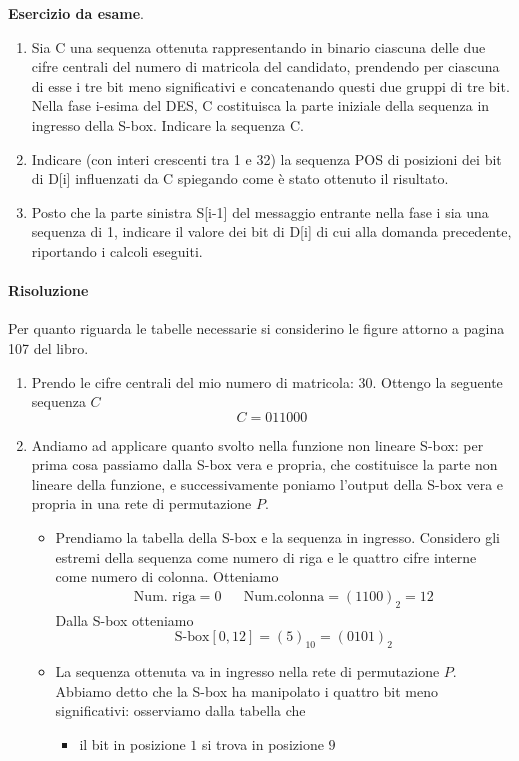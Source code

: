 \begin{framed}
	\noindent \textbf{Esercizio da esame}.
	
	\begin{enumerate}
		\item Sia C una sequenza ottenuta rappresentando in binario ciascuna delle due cifre centrali del
		numero di matricola del candidato, prendendo per ciascuna di esse i tre bit meno significativi e
		concatenando questi due gruppi di tre bit. Nella fase i-esima del DES, C costituisca la parte
		iniziale della sequenza in ingresso della S-box. Indicare la sequenza C.
		\item Indicare (con interi crescenti tra 1 e 32) la sequenza POS di posizioni dei bit di D[i] influenzati
		da C spiegando come è stato ottenuto il risultato.
		\item Posto che la parte sinistra S[i-1] del messaggio entrante nella fase i sia una sequenza di 1,
		indicare il valore dei bit di D[i] di cui alla domanda precedente, riportando i calcoli eseguiti.
	\end{enumerate}
	
	\paragraph{Risoluzione} Per quanto riguarda le tabelle necessarie si considerino le figure attorno a pagina 107 del libro.
	\begin{enumerate}
		\item Prendo le cifre centrali del mio numero di matricola: $30$. Ottengo la seguente sequenza $C$
		$$C=011000$$
		\item Andiamo ad applicare quanto svolto nella funzione non lineare S-box: per prima cosa passiamo dalla S-box vera e propria, che costituisce la parte non lineare della funzione, e successivamente poniamo l'output della S-box vera e propria in una rete di permutazione $P$. 
		\begin{itemize}
			\item Prendiamo la tabella della S-box e la sequenza in ingresso. Considero gli estremi della sequenza come numero di riga e le quattro cifre interne come numero di colonna. Otteniamo
			\begin{align*}
				\text{Num. riga} = 0 && \text{Num.colonna}=(1100)_2=12
			\end{align*}
			Dalla S-box otteniamo
			$$\text{S-box}[0,12]=(5)_{10}=(0101)_2$$
			\item La sequenza ottenuta va in ingresso nella rete di permutazione $P$. Abbiamo detto che la S-box ha manipolato i quattro bit meno significativi: osserviamo dalla tabella che
			\begin{itemize}
				\item  il bit in posizione $1$ si trova in posizione $9$
				

\end{itemize}
\end{itemize}
\end{enumerate}
\end{framed}

